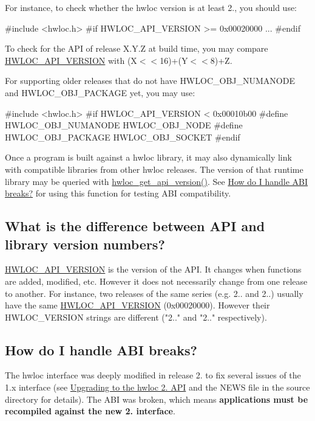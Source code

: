 For instance, to check whether the hwloc version is at least 2., you should use\+: \begin{DoxyVerb}#include <hwloc.h>
#if HWLOC_API_VERSION >= 0x00020000
...
#endif
\end{DoxyVerb}


To check for the A\+PI of release X.\+Y.\+Z at build time, you may compare \hyperlink{a00182_ga8f4dfb8eef138af55dd1a0fa802e5476}{H\+W\+L\+O\+C\+\_\+\+A\+P\+I\+\_\+\+V\+E\+R\+S\+I\+ON} with {\ttfamily (X$<$$<$16)+(Y$<$$<$8)+Z}.

For supporting older releases that do not have {\ttfamily H\+W\+L\+O\+C\+\_\+\+O\+B\+J\+\_\+\+N\+U\+M\+A\+N\+O\+DE} and {\ttfamily H\+W\+L\+O\+C\+\_\+\+O\+B\+J\+\_\+\+P\+A\+C\+K\+A\+GE} yet, you may use\+:

\begin{DoxyVerb}#include <hwloc.h>
#if HWLOC_API_VERSION < 0x00010b00
#define HWLOC_OBJ_NUMANODE HWLOC_OBJ_NODE
#define HWLOC_OBJ_PACKAGE HWLOC_OBJ_SOCKET
#endif
\end{DoxyVerb}


Once a program is built against a hwloc library, it may also dynamically link with compatible libraries from other hwloc releases. The version of that runtime library may be queried with \hyperlink{a00182_ga9c0b50c98add1adf57ed1ce85bb5190d}{hwloc\+\_\+get\+\_\+api\+\_\+version()}. See \hyperlink{a00394_faq_version_abi}{How do I handle A\+BI breaks?} for using this function for testing A\+BI compatibility.\hypertarget{a00394_faq_version}{}\subsection{What is the difference between A\+P\+I and library version numbers?}\label{a00394_faq_version}
\hyperlink{a00182_ga8f4dfb8eef138af55dd1a0fa802e5476}{H\+W\+L\+O\+C\+\_\+\+A\+P\+I\+\_\+\+V\+E\+R\+S\+I\+ON} is the version of the A\+PI. It changes when functions are added, modified, etc. However it does not necessarily change from one release to another. For instance, two releases of the same series (e.\+g. 2.. and 2..) usually have the same \hyperlink{a00182_ga8f4dfb8eef138af55dd1a0fa802e5476}{H\+W\+L\+O\+C\+\_\+\+A\+P\+I\+\_\+\+V\+E\+R\+S\+I\+ON} ({\ttfamily 0x00020000}). However their H\+W\+L\+O\+C\+\_\+\+V\+E\+R\+S\+I\+ON strings are different ({\ttfamily "2.."} and {\ttfamily "2.."} respectively).\hypertarget{a00394_faq_version_abi}{}\subsection{How do I handle A\+B\+I breaks?}\label{a00394_faq_version_abi}
The hwloc interface was deeply modified in release 2. to fix several issues of the 1.\+x interface (see \hyperlink{a00395}{Upgrading to the hwloc 2. A\+PI} and the N\+E\+WS file in the source directory for details). The A\+BI was broken, which means {\bfseries applications must be recompiled against the new 2. interface}.

